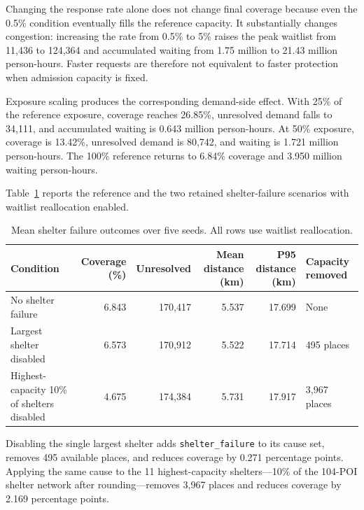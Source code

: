 Changing the response rate alone does not change final coverage because even the 0.5\% condition eventually fills the reference capacity. It substantially changes congestion: increasing the rate from 0.5\% to 5\% raises the peak waitlist from 11,436 to 124,364 and accumulated waiting from 1.75 million to 21.43 million person-hours. Faster requests are therefore not equivalent to faster protection when admission capacity is fixed.

Exposure scaling produces the corresponding demand-side effect. With 25\% of the reference exposure, coverage reaches 26.85\%, unresolved demand falls to 34,111, and accumulated waiting is 0.643 million person-hours. At 50\% exposure, coverage is 13.42\%, unresolved demand is 80,742, and waiting is 1.721 million person-hours. The 100\% reference returns to 6.84\% coverage and 3.950 million waiting person-hours.

Table~\ref{tbl:shelter_failures} reports the reference and the two retained shelter-failure scenarios with waitlist reallocation enabled.

\begin{table}[ht]
\centering
\footnotesize
\caption{Mean shelter failure outcomes over five seeds. All rows use waitlist reallocation.}
\label{tbl:shelter_failures}
\begin{tabularx}{\linewidth}{@{}>{\raggedright\arraybackslash}Xrrrrl@{}}
\toprule
\textbf{Condition} &
\shortstack{\textbf{Coverage}\\\textbf{(\%)}} &
\textbf{Unresolved} &
\shortstack{\textbf{Mean distance}\\\textbf{(km)}} &
\shortstack{\textbf{P95 distance}\\\textbf{(km)}} &
\textbf{Capacity removed} \\
\midrule
No shelter failure        & 6.843 & 170,417 & 5.537 & 17.699 & None \\
Largest shelter disabled  & 6.573 & 170,912 & 5.522 & 17.714 & 495 places \\
Highest-capacity 10\% of shelters disabled & 4.675 & 174,384 & 5.731 & 17.917 & 3,967 places \\
\bottomrule
\end{tabularx}
\end{table}

Disabling the single largest shelter adds \texttt{shelter\_failure} to its cause set, removes 495 available places, and reduces coverage by 0.271 percentage points. Applying the same cause to the 11 highest-capacity shelters---10\% of the 104-POI shelter network after rounding---removes 3,967 places and reduces coverage by 2.169 percentage points.

